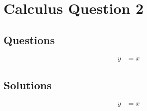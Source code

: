 \chapter{Calculus Question 2}
\label{chap:cq2}

\section{Questions}
\label{sec:cq2q}
\begin{align}
  y &= x
\end{align}

\section{Solutions}
\label{sec:cq2s}
\begin{align}
  y &= x
\end{align}